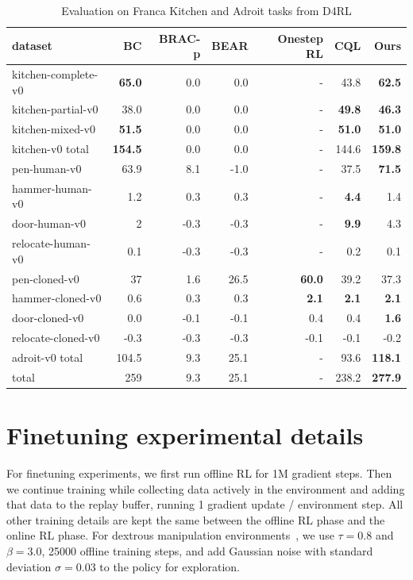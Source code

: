 \begin{table}[!htp]\centering
\caption{Evaluation on Franca Kitchen and Adroit tasks from D4RL}\label{tab:franca_adroit}
\scriptsize
\begin{tabular}{l||rrrrr|r}
dataset &BC &BRAC-p &BEAR &Onestep RL &CQL &Ours \\ \hline
kitchen-complete-v0 &\textbf{65.0} &0.0 &0.0 &- &43.8 &\textbf{62.5} \\
kitchen-partial-v0 &38.0 &0.0 &0.0 &- &\textbf{49.8} &\textbf{46.3} \\
kitchen-mixed-v0 &\textbf{51.5} &0.0 &0.0 &- &\textbf{51.0} &\textbf{51.0} \\ \hline
kitchen-v0 total &\textbf{154.5} &0.0 &0.0 &- &144.6 &\textbf{159.8} \\ \hline
pen-human-v0 &63.9 &8.1 &-1.0 &- &37.5 &\textbf{71.5} \\
hammer-human-v0 &1.2 &0.3 &0.3 &- &\textbf{4.4} &1.4 \\
door-human-v0 &2 &-0.3 &-0.3 &- &\textbf{9.9} &4.3 \\
relocate-human-v0 &0.1 &-0.3 &-0.3 &- &0.2 &0.1 \\
pen-cloned-v0 &37 &1.6 &26.5 &\textbf{60.0} &39.2 &37.3 \\
hammer-cloned-v0 &0.6 &0.3 &0.3 &\textbf{2.1} &\textbf{2.1} &\textbf{2.1} \\
door-cloned-v0 &0.0 &-0.1 &-0.1 &0.4 &0.4 &\textbf{1.6} \\
relocate-cloned-v0 &-0.3 &-0.3 &-0.3 &-0.1 &-0.1 &-0.2 \\ \hline
adroit-v0 total &104.5 &9.3 &25.1 &- &93.6 &\textbf{118.1} \\ \hline \hline
total &259 &9.3 &25.1 &- &238.2 &\textbf{277.9} \\
\end{tabular}
\end{table}

\section{Finetuning experimental details}
\label{app:finetuning}
For finetuning experiments, we first run offline RL for 1M gradient steps. Then we continue training while collecting data actively in the environment and adding that data to the replay buffer, running 1 gradient update / environment step. All other training details are kept the same between the offline RL phase and the online RL phase. For dextrous manipulation environments~\citep{rajeswaran2018dextrous}, we use $\tau=0.8$ and $\beta=3.0$, 25000 offline training steps, and add Gaussian noise with standard deviation $\sigma=0.03$ to the policy for exploration.

